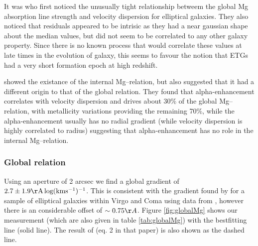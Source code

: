 {{{{		It was \citet{Bender1993} who first noticed the unusually tight relationship betweem the global Mg absorption line strength and velocity dispersion for elliptical galaxies. They also noticed that residuals appeared to be intrisic as they had a near gaussian shape about the median values, but did not seem to be correlated to any other galaxy property. Since there is no known process that would correlate these values at late times in the evolution of galaxy, this seems to favour the notion that ETGs had a very short formation epoch at high redshift. 

		\citet{Mehlert2003} showed the existance of the internal Mg--\textsigma relation, but also suggested that it had a different origin to that of the global relation. They found that alpha-enhancement correlates with velocity dispersion and drives about 30\% of the global Mg--\textsigma relation, with metallicity variations providing the remaining 70\%, while the alpha-enhancement usually has no radial gradient (while velocity dispersion is highly correlated to radius) suggesting that alpha-enhancement has no role in the internal Mg--\textsigma relation. 

		\subsubsection{Global relation}
			Using an aperture of 2 arcsec we find a global gradient of $2.7\pm1.9 \mathrm{\AA \, log(km s^{-1})^{-1}}$. This is consistent with the gradient found by \citet{Ziegler1997} for a sample of elliptical galaxies within Virgo and Coma using data from \citet{Dressler1987}, however there is an considerable offset of $\sim0.75\AA$. Figure \ref{fig:globalMg} shows our measurement (which are also given in table \ref{tab:globalMg}) with the bestfitting line (solid line). The result of \citet{Ziegler1997} (eq. 2 in that paper) is also shown as the dashed line. 

}}}}
